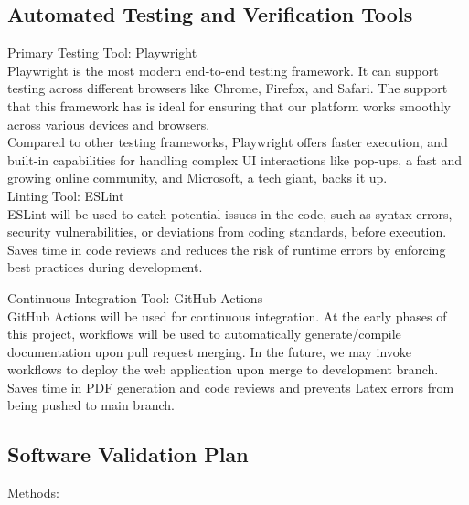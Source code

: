 \documentclass[12pt, titlepage]{article}
\begin{document}
\subsection{Automated Testing and Verification Tools}

\noindent Primary Testing Tool: Playwright\\

\noindent Playwright is the most modern end-to-end testing framework. It can support testing across different browsers like Chrome, Firefox, and Safari. The support that this framework has is ideal for ensuring that our platform works smoothly across various devices and browsers.\\

\noindent Compared to other testing frameworks, Playwright offers faster execution, and built-in capabilities for handling complex UI interactions like pop-ups, a fast and growing online community, and Microsoft, a tech giant, backs it up. \\

\noindent Linting Tool: ESLint\\

\noindent ESLint will be used to catch potential issues in the code, such as syntax errors, security vulnerabilities, or deviations from coding standards, before execution.\\

\noindent Saves time in code reviews and reduces the risk of runtime errors by enforcing best practices during development.

\noindent Continuous Integration Tool: GitHub Actions\\

\noindent GitHub Actions will be used for continuous integration. At the early phases of this project, workflows will be used to automatically generate/compile documentation upon pull request merging. In the future, we may invoke workflows to deploy the web application upon merge to development branch. \\

\noindent Saves time in PDF generation and code reviews and prevents Latex errors from being pushed to main branch. \\

\subsection{Software Validation Plan}

Methods: \\
\end{document}
